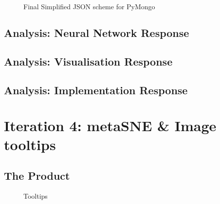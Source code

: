 \documentclass[a4paper,11pt,titlepage]{article}
\begin{document}
	\begin{figure}[H]
    			\caption{Final Simplified JSON scheme for PyMongo}%
	\end{figure}
	
	
	
	\subsection{Analysis: Neural Network Response}
	\subsection{Analysis: Visualisation Response}
	\subsection{Analysis: Implementation Response}
	
\section{Iteration 4: metaSNE \& Image tooltips}
	\subsection{The Product}
	
	\begin{figure}[H]
    			\caption{Tooltips}%
	\end{figure}		
	
\end{document}
